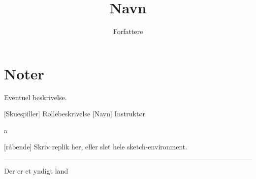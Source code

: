 \documentclass{article}
\title{Navn}                   %
\author{Forfattere}  %
\begin{document}
                
\maketitle
\section*{Noter}                %
Eventuel beskrivelse.

\begin{roles}
[Skuespiller] Rollebeskrivelse
[Navn] Instruktør
\end{roles}

\begin{props}
     a
\end{props}

\newpage%
\begin{sketch}
[råbende] Skriv replik her, eller slet hele sketch-environment.
 
\end{sketch}

\smallskip\hfil\rule{6cm}{0.1mm}\medskip\par
\newpage

\begin{song}
[Vers 1]
%
Der er et yndigt land
\end{song}

\end{document}

